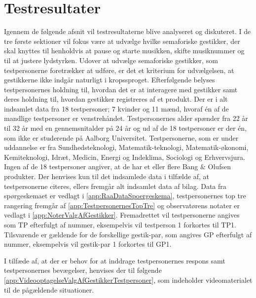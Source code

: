 \chapter{Testresultater}
\label{Testresultater}
%
Igennem de følgende afsnit vil testresultaterne blive analyseret og diskuteret. I de tre første sektioner vil fokus være at udvælge hvilke semaforiske gestikker, der skal knyttes til henholdvis at pause og starte musikken, skifte musiknummer og til at justere lydstyrken. Udover at udvælge semaforiske gestikker, som testpersonerne foretrækker at udføre, er det et kriterium for udvælgelsen, at gestikkerne ikke indgår naturligt i kropssproget. Efterfølgende belyses testpersonernes holdning til, hvordan det er at interagere med gestikker samt deres holdning til, hvordan gestikker registreres af et produkt.\blankline
%
Der er i alt indsamlet data fra 18 testpersoner; 7 kvinder og 11 mænd, hvoraf én af de mandlige testpersoner er venstrehåndet. Testpersonernes alder spænder fra 22 år til 32 år med en gennemsnitalder på 24 år og ud af de 18 testpersoner er der én, som ikke er studerende på Aalborg Universitet. Testpersonerne, som er under uddannelse er fra Sundhedsteknologi, Matematik-teknologi, Matematik-økonomi, Kemiteknologi, Idræt, Medicin, Energi og Indeklima, Sociologi og Erhvervsjura. Ingen af de 18 testpersoner angiver, at de har et eller flere Bang $\&$ Olufsen produkter. Der henvises kun til det indsamlede data i tilfælde af, at testpersonerne citeres, ellers fremgår alt indsamlet data af bilag. Data fra spørgeskemaet er vedlagt i \autoref{app:RaaDataSpoergeskema}, testpersonernes top tre rangering fremgår af \autoref{app:TestpersonernesTopTre} og observatørens notater er vedlagt i \autoref{app:NoterValgAfGestikker}. Fremadrettet vil testpersonerne angives som TP efterfulgt af nummer, eksempelvis vil testperson 1 forkortes til TP1. Tilsvarende er gældende for de forskellige gestik-par, som angives GP efterfulgt af nummer, eksempelvis vil gestik-par 1 forkortes til GP1.

I tilfæde af, at der er behov for at inddrage testpersonernes respons samt testpersonernes bevægelser, henvises der til følgende \autoref{app:VideooptagelseValgAfGestikkerTestpersoner}, som indeholder videomaterialet til de pågældende situationer.       